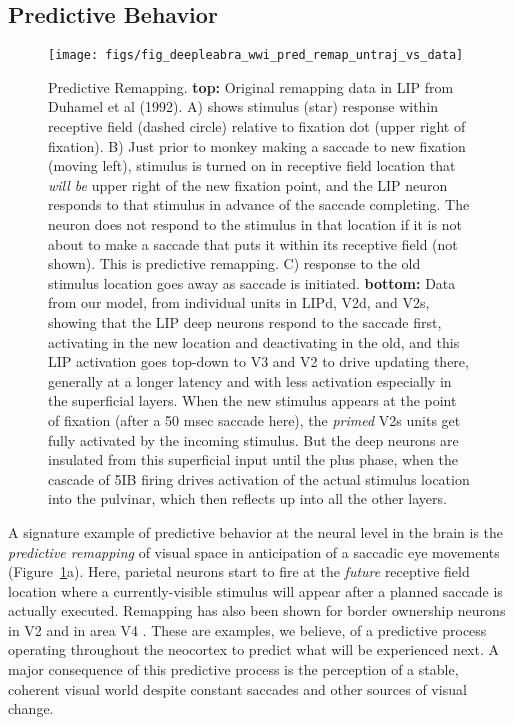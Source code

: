 \documentclass[11pt,twoside]{article}
\newif\myifpdf
\begin{document}
\subsection{Predictive Behavior}

\begin{figure}
  \centering\texttt{[image: figs/fig\_deepleabra\_wwi\_pred\_remap\_untraj\_vs\_data]}
  \caption{Predictive Remapping.  {\bf top:} Original remapping data in LIP from Duhamel et al (1992).  A) shows stimulus (star) response within receptive field (dashed circle) relative to fixation dot (upper right of fixation).  B) Just prior to monkey making a saccade to new fixation (moving left), stimulus is turned on in receptive field location that {\em will be} upper right of the new fixation point, and the LIP neuron responds to that stimulus in advance of the saccade completing.  The neuron does not respond to the stimulus in that location if it is not about to make a saccade that puts it within its receptive field (not shown).  This is predictive remapping.  C) response to the old stimulus location goes away as saccade is initiated.  {\bf bottom:} Data from our model, from individual units in LIPd, V2d, and V2s, showing that the LIP deep neurons respond to the saccade first, activating in the new location and deactivating in the old, and this LIP activation goes top-down to V3 and V2 to drive updating there, generally at a longer latency and with less activation especially in the superficial layers.  When the new stimulus appears at the point of fixation (after a 50 msec saccade here), the {\em primed} V2s units get fully activated by the incoming stimulus.  But the deep neurons are insulated from this superficial input until the plus phase, when the cascade of 5IB firing drives activation of the actual stimulus location into the pulvinar, which then reflects up into all the other layers.}
  \label{fig.remap_units}
\end{figure}

A signature example of predictive behavior at the neural level in the brain is the {\em predictive remapping} of visual space in anticipation of a saccadic eye movements \citep{DuhamelColbyGoldberg92,ColbyDuhamelGoldberg97,GottliebKusunokiGoldberg98,NakamuraColby02,MarinoMazer16} (Figure~\ref{fig.remap_units}a).  Here, parietal neurons start to fire at the {\em future} receptive field location where a currently-visible stimulus will appear after a planned saccade is actually executed. Remapping has also been shown for border ownership neurons in V2 \citep{OHerronHeydt13} and in area V4 \citep{NeupaneGuittonPack16,NeupaneGuittonPack20}. These are examples, we believe, of a predictive process operating throughout the neocortex to predict what will be experienced next.  A major consequence of this predictive process is the perception of a stable, coherent visual world despite constant saccades and other sources of visual change. 
\end{document}
